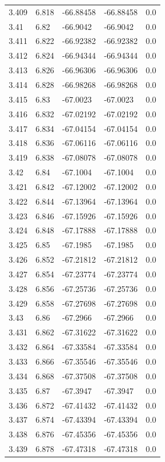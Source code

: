 \begin{tabular}{lllll}
3.409 & 6.818 & -66.88458 & -66.88458 & 0.0 \\
3.41 & 6.82 & -66.9042 & -66.9042 & 0.0 \\
3.411 & 6.822 & -66.92382 & -66.92382 & 0.0 \\
3.412 & 6.824 & -66.94344 & -66.94344 & 0.0 \\
3.413 & 6.826 & -66.96306 & -66.96306 & 0.0 \\
3.414 & 6.828 & -66.98268 & -66.98268 & 0.0 \\
3.415 & 6.83 & -67.0023 & -67.0023 & 0.0 \\
3.416 & 6.832 & -67.02192 & -67.02192 & 0.0 \\
3.417 & 6.834 & -67.04154 & -67.04154 & 0.0 \\
3.418 & 6.836 & -67.06116 & -67.06116 & 0.0 \\
3.419 & 6.838 & -67.08078 & -67.08078 & 0.0 \\
3.42 & 6.84 & -67.1004 & -67.1004 & 0.0 \\
3.421 & 6.842 & -67.12002 & -67.12002 & 0.0 \\
3.422 & 6.844 & -67.13964 & -67.13964 & 0.0 \\
3.423 & 6.846 & -67.15926 & -67.15926 & 0.0 \\
3.424 & 6.848 & -67.17888 & -67.17888 & 0.0 \\
3.425 & 6.85 & -67.1985 & -67.1985 & 0.0 \\
3.426 & 6.852 & -67.21812 & -67.21812 & 0.0 \\
3.427 & 6.854 & -67.23774 & -67.23774 & 0.0 \\
3.428 & 6.856 & -67.25736 & -67.25736 & 0.0 \\
3.429 & 6.858 & -67.27698 & -67.27698 & 0.0 \\
3.43 & 6.86 & -67.2966 & -67.2966 & 0.0 \\
3.431 & 6.862 & -67.31622 & -67.31622 & 0.0 \\
3.432 & 6.864 & -67.33584 & -67.33584 & 0.0 \\
3.433 & 6.866 & -67.35546 & -67.35546 & 0.0 \\
3.434 & 6.868 & -67.37508 & -67.37508 & 0.0 \\
3.435 & 6.87 & -67.3947 & -67.3947 & 0.0 \\
3.436 & 6.872 & -67.41432 & -67.41432 & 0.0 \\
3.437 & 6.874 & -67.43394 & -67.43394 & 0.0 \\
3.438 & 6.876 & -67.45356 & -67.45356 & 0.0 \\
3.439 & 6.878 & -67.47318 & -67.47318 & 0.0 \\

\end{tabular}
